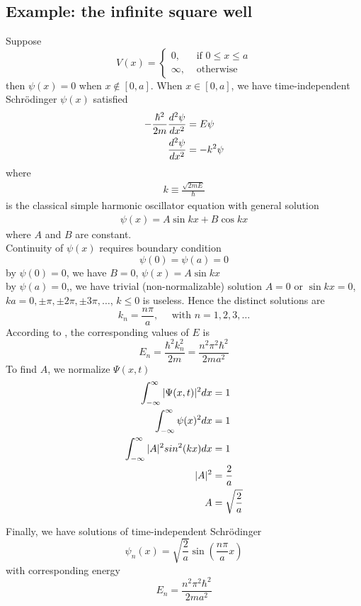 \subsection{Example: the infinite square well}
Suppose     
\begin{equation*}
    V(x)= \begin{cases}0, & \text { if } 0 \leq x \leq a \\ \infty, & \text { otherwise }\end{cases}
    \end{equation*}
then $\psi(x)=0$ when $x \notin [0,a]$. When $x \in [0,a]$, we have time-independent Schrödinger $\psi(x)$ satisfied
\begin{align}
    -\frac{\hbar^{2}}{2 m} \frac{d^{2} \psi}{d x^{2}}&=E \psi \notag\\
    \frac{d^{2} \psi}{d x^{2}}&=-k^{2} \psi \label{eq12}
\end{align}
where 
\begin{align}
    \boxed{k \equiv \frac{\sqrt{2 m E}}{\hbar}} \label{eq13}
\end{align}
 is the classical simple harmonic oscillator equation with general solution
\begin{align}
    \psi(x)=A \sin k x+B \cos k x
\end{align}
where $A$ and $B$ are constant.\\
Continuity of $\psi(x)$ requires boundary condition
$$\psi(0)=\psi(a)=0$$
by $\psi(0)=0$, we have $B=0$, $\psi(x)=A \sin kx$\\
by $\psi(a)=0$,, we have trivial (non-normalizable) solution $A=0$ or $\sin kx=0$, \\$k a=0, \pm \pi, \pm 2 \pi, \pm 3 \pi, \ldots$, $k\leq 0$ is useless. Hence the distinct solutions are 
$$
k_{n}=\frac{n \pi}{a}, \quad \text { with } n=1,2,3, \ldots
$$
According to , the corresponding values of $E$ is 
$$
E_{n}=\frac{\hbar^{2} k_{n}^{2}}{2 m}=\frac{n^{2} \pi^{2} \hbar^{2}}{2 m a^{2}}
$$
To find $A$, we normalize $\Psi(x,t)$
\begin{align*}
    \int_{-\infty}^{\infty} |\Psi(x,t)|^2 dx &= 1\\
    \int_{-\infty}^{\infty} \psi(x)^2 dx &=1\\
    \int_{-\infty}^{\infty} |A|^2 sin^2(kx) dx &= 1\\
    |A|^2 &=\frac{2}{a}\\
    A &= \sqrt{\frac{2}{a}}
\end{align*}

Finally, we have solutions of time-independent Schrödinger 
$$
\psi_{n}(x)=\sqrt{\frac{2}{a}} \sin \left(\frac{n \pi}{a} x\right)
$$
with corresponding energy
$$
E_{n}=\frac{n^{2} \pi^{2} \hbar^{2}}{2 m a^{2}}
$$





